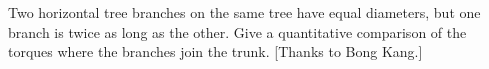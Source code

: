 Two horizontal tree branches on the same tree have equal diameters, but one branch
is twice as long as the other. Give a quantitative comparison of the torques where the branches 
join the trunk.
[Thanks to Bong Kang.]
